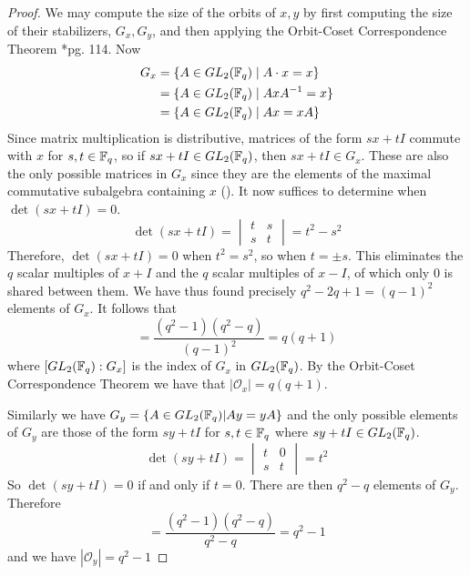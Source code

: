 \documentclass{amsart}
\begin{document}
\begin{proof}
    We may compute the size of the orbits of $x, y$ by first computing the size of their stabilizers, $G_x, G_y$, and then applying the Orbit-Coset Correspondence Theorem \cite{DandF}*{pg. 114}.
    Now
    \begin{align*}
        G_x &= \{A \in GL_2(\protect\mathbb{F}_q) \mid A \cdot x = x\} \\
            &= \{A \in GL_2(\protect\mathbb{F}_q) \mid AxA^{-1} = x\} \\
            &= \{A \in GL_2(\protect\mathbb{F}_q) \mid Ax = xA\} 
    \end{align*}
    Since matrix multiplication is distributive, matrices of the form $sx + tI$ commute with $x$ for $s,t \in \protect\mathbb{F}_q$, so if $sx + tI \in GL_2(\protect\mathbb{F}_q)$, then $sx + tI \in G_x$. These are also the only possible matrices in $G_x$ since they are the elements of the maximal commutative subalgebra containing $x$ (). It now suffices to determine when $\det(sx + tI) = 0$.
    \begin{equation*}
        \det(sx+tI) =
        \begin{vmatrix}
            t & s \\
            s & t
        \end{vmatrix} = t^2 - s^2
    \end{equation*}
    Therefore, $\det(sx + tI) = 0$ when $t^2 = s^2$, so when $t = \pm s$. This eliminates the $q$ scalar multiples of $x + I$ and the $q$ scalar multiples of $x - I$, of which only $0$ is shared between them. We have thus found precisely $q^2 - 2q + 1 = (q-1)^2$ elements of $G_x$. It follows that
    \begin{equation*}
        [GL_2(\bF_q) : G_x] = \frac{(q^2-1)(q^2-q)}{(q-1)^2} = q(q + 1)
    \end{equation*}
    where $[GL_2(\protect\mathbb{F}_q) : G_x]$ is the index of $G_x$ in $GL_2(\protect\mathbb{F}_q)$. By the Orbit-Coset Correspondence Theorem we have that $|\mathcal{O}_x| = q(q + 1)$.

    Similarly we have $G_y = \{A \in GL_2(\protect\mathbb{F}_q) | Ay = yA\}$ and the only possible elements of $G_y$ are those of the form $sy + tI$ for $s,t \in \protect\mathbb{F}_q$ where $sy+tI \in GL_2(\protect\mathbb{F}_q)$.
    \begin{equation*}
        \det(sy+tI) =
        \begin{vmatrix}
            t & 0 \\
            s & t
        \end{vmatrix} = t^2
    \end{equation*}
    So $\det(sy + tI) = 0$ if and only if $t = 0$. There are then $q^2 - q$ elements of $G_y$. Therefore
    \begin{equation*}
        [GL_2(\bF_q) : G_y] = \frac{(q^2-1)(q^2-q)}{q^2 - q} = q^2 - 1
    \end{equation*}
    and we have $|\mathcal{O}_y| = q^2 - 1$
\end{proof}
\end{document}
